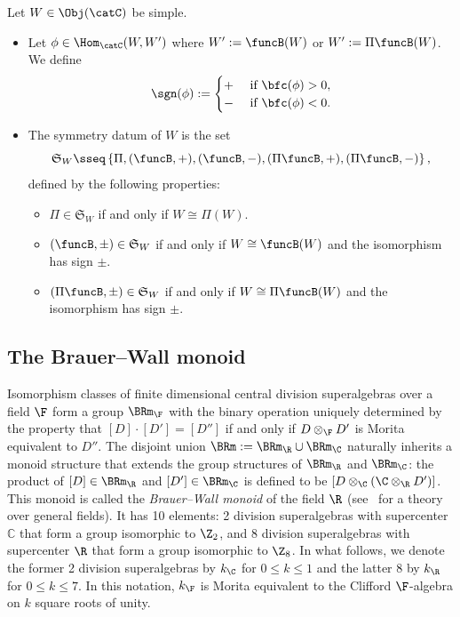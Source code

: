 \documentclass[12pt]{amsart}
\begin{document}
\begin{dfn}
Let $W\in\Obj(\catC)$ be simple. \begin{itemize}
\item[(i)] Let $\phi\in\Hom_\catC(W,W')$ where $W':=\funcB(W)$ or $W':=\Pi\funcB(W)$.  We define \[
\sgn(\phi):=\begin{cases}
+&\text{ if }\bfc(\phi)>0,\\
-&\text{ if }\bfc(\phi)<0.
\end{cases}
\] 
\item[(ii)] The symmetry datum of $W$ is the set \[
\mathfrak S_W\sseq \left\{\Pi,(\funcB,+),(\funcB,-),(\Pi\funcB,+),(\Pi\funcB,-)\right\},
\] defined by  the following properties:
\begin{itemize}
\item[(ii-a)] $\Pi\in \mathfrak S_W$ if and only if $W\cong \Pi(W)$.
\item[(ii-b)] $(\funcB,\pm)\in \mathfrak S_W$ if and only if $W\cong \funcB(W)$ and the isomorphism has sign $\pm$. 
\item[(ii-c)]
$(\Pi\funcB,\pm)\in \mathfrak S_W$ if and only if $W\cong \Pi\funcB(W)$ and the isomorphism has sign $\pm$.
  
\end{itemize} 
\end{itemize}
\end{dfn}


\subsection{The Brauer--Wall monoid}
Isomorphism classes of finite dimensional central division superalgebras over a field $\F$ form a group $\BRm_\F$ with the binary operation uniquely determined by the property that  $[D]\cdot [D']=[D'']$ if and only if $D\otimes_\F D'$ is Morita equivalent to $D''$. 
The disjoint union 
$\BRm:=\BRm_\R\cup\BRm_\C$ naturally inherits a monoid structure that extends the group structures of $\BRm_\R$ and $\BRm_\C$: the product of $[D]\in\BRm_\R$ and $[D']\in\BRm_\C$ is defined to be $[D\otimes_\C (\C\otimes_\R D')]$.  This monoid is called  the \emph{Brauer--Wall monoid} of the field $\R$ (see~\cite{Wall} for a theory  over general fields). It  has 10 elements: 2 division superalgebras with supercenter $\mathbb C$ that form a group isomorphic to $\Z_2$, and 8 division superalgebras with supercenter $\R$ that form a group isomorphic to $\Z_8$. 
In what follows,  we denote the former 2 division superalgebras by $k_\C$ for $0\leq k\leq 1$ and the  latter 8 by $k_\R$ for $0\leq k\leq 7$. In this notation, $k_\F$ is Morita equivalent to the Clifford $\F$-algebra on $k$ square roots of unity. 
\end{document}
